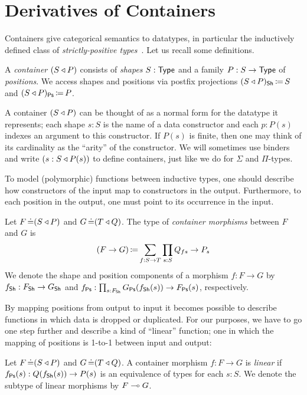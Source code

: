 \section{Derivatives of Containers}\label{derivatives}

Containers give categorical semantics to datatypes,
in particular the inductively defined class of \emph{strictly-positive types}~\cite{Abbott2003CategoriesContainers}.
Let us recall some definitions.
\begin{definition}
  A \emph{container} \( (S\mathbin{\triangleleft}P) \) consists of \emph{shapes} \( S : \operatorname{\mathsf{Type}} \) and
  a family \( P : S \to \operatorname{\mathsf{Type}} \) of \emph{positions}.
  We access shapes and positions via postfix projections
  \( (S\mathbin{\triangleleft}P)_{\operatorname{\mathsf{Sh}}} \operatorname{\mathrel{\coloneq}} S \) and \( (S\mathbin{\triangleleft}P)_{\operatorname{\mathsf{Ps}}} \operatorname{\mathrel{\coloneq}} P \).
\end{definition}
A container \( (S\mathbin{\triangleleft}P) \) can be thought of as a normal form for the datatype it represents;
each shape \( s : S \) is the name of a data constructor
and each \( p : P(s) \) indexes an argument to this constructor.
If \( P(s) \) is finite, then one may think of its cardinality as the \enquote{arity} of the constructor.
We will sometimes use binders and write \( (s : S\mathbin{\triangleleft}P(s)) \) to define containers,
just like we do for \( \Sigma \) and \( \Pi \)-types.

To model (polymorphic) functions between inductive types,
one should describe how constructors of the input map to constructors in the output.
Furthermore, to each position in the output, one must point to its occurrence in the input.
\begin{definition}\label{container-morphism}
  Let \( F \operatorname{\mathrel{\doteq}} (S\mathbin{\triangleleft}P) \) and \( G \operatorname{\mathrel{\doteq}} (T\mathbin{\triangleleft}Q) \).
  The type of \emph{container morphisms} between \( F \) and \( G \) is
  \[
    (F \to G) \operatorname{\mathrel{\coloneq}} \sum_{f : S \to T} \prod_{s : S} Q_{fs} \to P_s
  \]
  We denote the shape and position components of a morphism \( {f : F \to G} \)
  by \( {f_{\operatorname{\mathsf{Sh}}} : F_{\operatorname{\mathsf{Sh}}} \to G_{\operatorname{\mathsf{Sh}}}} \) and \( f_{\operatorname{\mathsf{Ps}}} : \prod_{s : F_{\operatorname{\mathsf{Sh}}}} G_{\operatorname{\mathsf{Ps}}}(f_{\operatorname{\mathsf{Sh}}}(s)) \to F_{\operatorname{\mathsf{Ps}}}(s) \), respectively.
\end{definition}

By mapping positions from output to input it becomes possible to describe functions in which data is dropped or duplicated.
For our purposes, we have to go one step further and describe a kind of \enquote{linear} function;
one in which the mapping of positions is 1-to-1 between input and output:
\begin{definition}
  Let \( F \operatorname{\mathrel{\doteq}} (S\mathbin{\triangleleft}P) \) and \( G \operatorname{\mathrel{\doteq}} (T\mathbin{\triangleleft}Q) \).
  A container morphism \(f : F \to G \) is \emph{linear}
  if \( f_{\operatorname{\mathsf{Ps}}}(s) : Q(f_{\operatorname{\mathsf{Sh}}}(s)) \to P(s) \)
  is an equivalence of types for each \( s : S \).
  We denote the subtype of linear morphisms by \( F\mathrel{\multimap}G \).
\end{definition}

